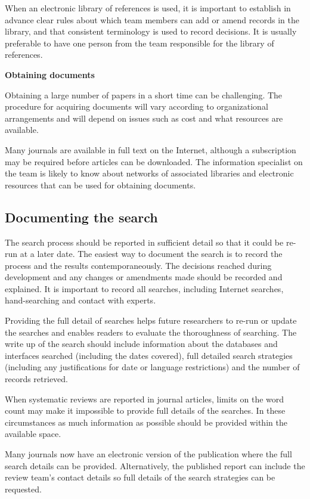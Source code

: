 \documentclass[
  10pt,
  a4paper,
  DIV=11,
  numbers=noendperiod]{scrreprt}
\begin{document}
When an electronic library of references is used, it is important to
establish in advance clear rules about which team members can add or
amend records in the library, and that consistent terminology is used to
record decisions. It is usually preferable to have one person from the
team responsible for the library of references.

\textbf{Obtaining documents}

Obtaining a large number of papers in a short time can be challenging.
The procedure for acquiring documents will vary according to
organizational arrangements and will depend on issues such as cost and
what resources are available.

Many journals are available in full text on the Internet, although a
subscription may be required before articles can be downloaded. The
information specialist on the team is likely to know about networks of
associated libraries and electronic resources that can be used for
obtaining documents.

\subsection{Documenting the search}\label{documenting-the-search}

The search process should be reported in sufficient detail so that it
could be re-run at a later date. The easiest way to document the search
is to record the process and the results contemporaneously. The
decisions reached during development and any changes or amendments made
should be recorded and explained. It is important to record all
searches, including Internet searches, hand-searching and contact with
experts.

Providing the full detail of searches helps future researchers to re-run
or update the searches and enables readers to evaluate the thoroughness
of searching. The write up of the search should include information
about the databases and interfaces searched (including the dates
covered), full detailed search strategies (including any justifications
for date or language restrictions) and the number of records retrieved.

When systematic reviews are reported in journal articles, limits on the
word count may make it impossible to provide full details of the
searches. In these circumstances as much information as possible should
be provided within the available space.

Many journals now have an electronic version of the publication where
the full search details can be provided. Alternatively, the published
report can include the review team's contact details so full details of
the search strategies can be requested.
\end{document}
